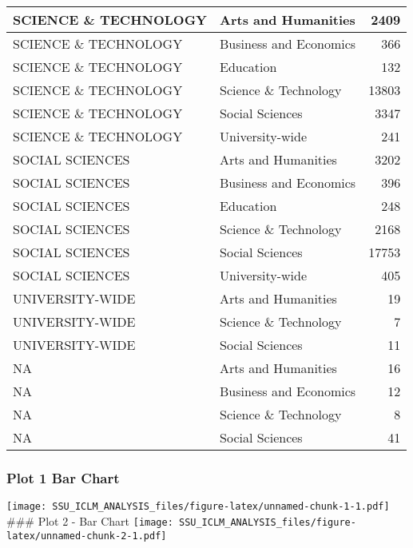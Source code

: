 \documentclass[]{article}
\begin{document}
\begin{table}[H]
\begin{tabular}{l|l|r}
\hline
SCIENCE \& TECHNOLOGY & Arts and Humanities & 2409\\
\hline
SCIENCE \& TECHNOLOGY & Business and Economics & 366\\
\hline
SCIENCE \& TECHNOLOGY & Education & 132\\
\hline
SCIENCE \& TECHNOLOGY & Science \& Technology & 13803\\
\hline
SCIENCE \& TECHNOLOGY & Social Sciences & 3347\\
\hline
SCIENCE \& TECHNOLOGY & University-wide & 241\\
\hline
SOCIAL SCIENCES & Arts and Humanities & 3202\\
\hline
SOCIAL SCIENCES & Business and Economics & 396\\
\hline
SOCIAL SCIENCES & Education & 248\\
\hline
SOCIAL SCIENCES & Science \& Technology & 2168\\
\hline
SOCIAL SCIENCES & Social Sciences & 17753\\
\hline
SOCIAL SCIENCES & University-wide & 405\\
\hline
UNIVERSITY-WIDE & Arts and Humanities & 19\\
\hline
UNIVERSITY-WIDE & Science \& Technology & 7\\
\hline
UNIVERSITY-WIDE & Social Sciences & 11\\
\hline
NA & Arts and Humanities & 16\\
\hline
NA & Business and Economics & 12\\
\hline
NA & Science \& Technology & 8\\
\hline
NA & Social Sciences & 41\\
\hline
\end{tabular}\endgroup{}
\end{table}

\subsubsection{Plot 1 Bar Chart}\label{plot-1-bar-chart}

\texttt{[image: SSU\_ICLM\_ANALYSIS\_files/figure-latex/unnamed-chunk-1-1.pdf]}
\#\#\# Plot 2 - Bar Chart
\texttt{[image: SSU\_ICLM\_ANALYSIS\_files/figure-latex/unnamed-chunk-2-1.pdf]}
\end{document}
